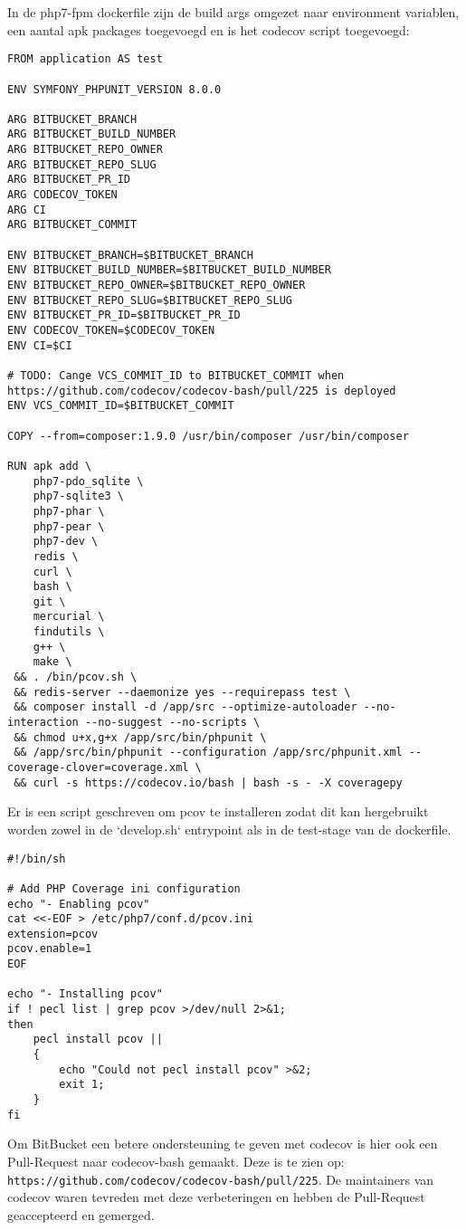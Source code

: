 In de php7-fpm dockerfile zijn de build args omgezet naar environment variablen, een aantal apk packages toegevoegd en is het codecov script toegevoegd:
\begin{verbatim}
FROM application AS test

ENV SYMFONY_PHPUNIT_VERSION 8.0.0

ARG BITBUCKET_BRANCH
ARG BITBUCKET_BUILD_NUMBER
ARG BITBUCKET_REPO_OWNER
ARG BITBUCKET_REPO_SLUG
ARG BITBUCKET_PR_ID
ARG CODECOV_TOKEN
ARG CI
ARG BITBUCKET_COMMIT

ENV BITBUCKET_BRANCH=$BITBUCKET_BRANCH
ENV BITBUCKET_BUILD_NUMBER=$BITBUCKET_BUILD_NUMBER
ENV BITBUCKET_REPO_OWNER=$BITBUCKET_REPO_OWNER
ENV BITBUCKET_REPO_SLUG=$BITBUCKET_REPO_SLUG
ENV BITBUCKET_PR_ID=$BITBUCKET_PR_ID
ENV CODECOV_TOKEN=$CODECOV_TOKEN
ENV CI=$CI

# TODO: Cange VCS_COMMIT_ID to BITBUCKET_COMMIT when https://github.com/codecov/codecov-bash/pull/225 is deployed
ENV VCS_COMMIT_ID=$BITBUCKET_COMMIT

COPY --from=composer:1.9.0 /usr/bin/composer /usr/bin/composer

RUN apk add \
    php7-pdo_sqlite \
    php7-sqlite3 \
    php7-phar \
    php7-pear \
    php7-dev \
    redis \
    curl \
    bash \
    git \
    mercurial \
    findutils \
    g++ \
    make \
 && . /bin/pcov.sh \
 && redis-server --daemonize yes --requirepass test \
 && composer install -d /app/src --optimize-autoloader --no-interaction --no-suggest --no-scripts \
 && chmod u+x,g+x /app/src/bin/phpunit \
 && /app/src/bin/phpunit --configuration /app/src/phpunit.xml --coverage-clover=coverage.xml \
 && curl -s https://codecov.io/bash | bash -s - -X coveragepy
\end{verbatim}

Er is een script geschreven om pcov te installeren zodat dit kan hergebruikt worden zowel in de `develop.sh` entrypoint als in de test-stage van de dockerfile.
\begin{verbatim}
#!/bin/sh

# Add PHP Coverage ini configuration
echo "- Enabling pcov"
cat <<-EOF > /etc/php7/conf.d/pcov.ini
extension=pcov
pcov.enable=1
EOF

echo "- Installing pcov"
if ! pecl list | grep pcov >/dev/null 2>&1;
then
    pecl install pcov ||
    {
        echo "Could not pecl install pcov" >&2;
        exit 1;
    }
fi
\end{verbatim}

Om BitBucket een betere ondersteuning te geven met codecov is hier ook een Pull-Request naar codecov-bash gemaakt. Deze is te zien op:\\ \texttt{https://github.com/codecov/codecov-bash/pull/225}. De maintainers van codecov waren tevreden met deze verbeteringen en hebben de Pull-Request geaccepteerd en gemerged.